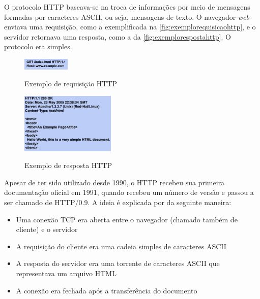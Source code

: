 O protocolo HTTP baseava-se na troca de informações por meio de mensagens formadas por caracteres ASCII, ou seja, mensagens de texto. O navegador \textit{web} enviava uma requisição, como a exemplificada na \autoref{fig:exemplorequisicaohttp}, e o servidor retornava uma resposta, como a da \autoref{fig:exemplorespostahttp}. O protocolo era simples.

\begin{figure}[!htb]
    \centering
    \caption{Exemplo de requisição HTTP}
    \includegraphics[width=0.2\textwidth]{./04-figuras/fund-teorica/http_exemplo_requisicao}
    \label{fig:exemplorequisicaohttp}
\end{figure}

\begin{figure}[!htb]
    \centering
    \caption{Exemplo de resposta HTTP}
    \includegraphics[width=0.4\textwidth]{./04-figuras/fund-teorica/http_exemplo_resposta}
    \label{fig:exemplorespostahttp}
\end{figure}

Apesar de ter sido utilizado desde 1990, o HTTP recebeu sua primeira documentação oficial em 1991, quando recebeu um número de versão e passou a ser chamado de HTTP/0.9. A ideia é explicada por  da seguinte maneira:

\begin{itemize}
	\item Uma conexão TCP era aberta entre o navegador (chamado também de cliente) e o servidor
	\item A requisição do cliente era uma cadeia simples de caracteres ASCII
	\item A resposta do servidor era uma torrente de caracteres ASCII que representava um arquivo HTML
	\item A conexão era fechada após a transferência do documento 
\end{itemize}


